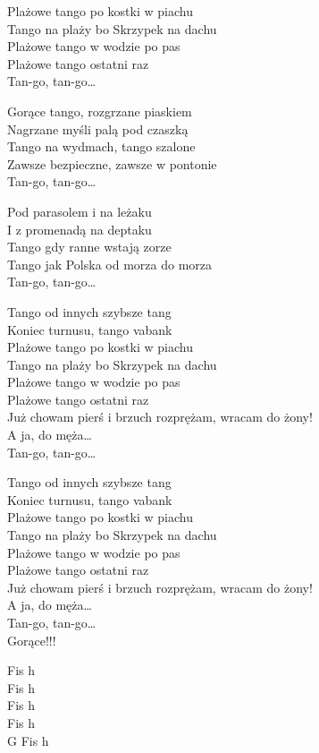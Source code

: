 \begin{text}
    Plażowe tango po kostki w piachu\\
    Tango na plaży bo Skrzypek na dachu\\
    Plażowe tango w wodzie po pas\\
    Plażowe tango ostatni raz\\
    Tan-go, tan-go…

    Gorące tango, rozgrzane piaskiem\\
    Nagrzane myśli palą pod czaszką\\
    Tango na wydmach, tango szalone\\
    Zawsze bezpieczne, zawsze w pontonie\\
    Tan-go, tan-go…

    Pod parasolem i na leżaku\\
    I z promenadą na deptaku\\
    Tango gdy ranne wstają zorze\\
    Tango jak Polska od morza do morza\\
    Tan-go, tan-go…

    Tango od innych szybsze tang\\
    Koniec turnusu, tango vabank\\
    Plażowe tango po kostki w piachu\\
    Tango na plaży bo Skrzypek na dachu\\
    Plażowe tango w wodzie po pas\\
    Plażowe tango ostatni raz\\
    Już chowam pierś i brzuch rozprężam, wracam do żony!\\
    A ja, do męża…\\
    Tan-go, tan-go…

    Tango od innych szybsze tang\\
    Koniec turnusu, tango vabank\\
    Plażowe tango po kostki w piachu\\
    Tango na plaży bo Skrzypek na dachu\\
    Plażowe tango w wodzie po pas\\
    Plażowe tango ostatni raz\\
    Już chowam pierś i brzuch rozprężam, wracam do żony!\\
    A ja, do męża…\\
    Tan-go, tan-go…\\
    Gorące!!!
\end{text}
\begin{chord}
    Fis h\\
    Fis h\\
    Fis h\\
    Fis h\\
    G Fis h
\end{chord}